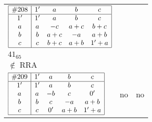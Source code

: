 \documentclass[12pt]{article}
\newcommand\RRA{\operatorname{RRA}}
\newcommand\notRRA{\ensuremath{\notin \RRA}}
\newcommand{\join}{\mathbin{+}}%
\newcommand{\id}{{1'}}%
\renewcommand{\div}{0'}
\begin{document}
\begin{center}
\begin{longtable}{l|c|c}
$
\begin{array}{|c|cccc|} \hline
\#208 & \id & a & b & c \\ \hline
\id & \id & a & b & c \\
a & a & -c & a \join c & b \join c \\
b & b & a \join c & -a & a \join b \\
c & c & b \join c & a \join b & \id \join a \\ \hline
\end{array}
$
 & \begin{tabular}{c} yes \\ $41_{65}$ \\ \notRRA \end{tabular} 
 & \adjustbox{valign=c, max height=1.6cm}{$
\left[ \begin{array}{cccccc}
\id & a & a & b & b & b \\ 
a & \id & a & a & c & a \\ 
a & a & \id & a & c & a \\ 
b & a & a & \id & b & b \\ 
b & c & c & b & \id & c \\ 
b & a & a & b & c & \id
\end{array}\right]
$}      \\[15mm]

$
\begin{array}{|c|cccc|} \hline
\#209 & \id & a & b & c \\ \hline
\id & \id & a & b & c \\
a & a & -b & c & \div \\
b & b & c & -a & a \join b \\
c & c & \div & a \join b & \id \join a \\ \hline
\end{array}
$
 & no  
 & no     \\[15mm]


\end{longtable}
\end{center}
\end{document}
